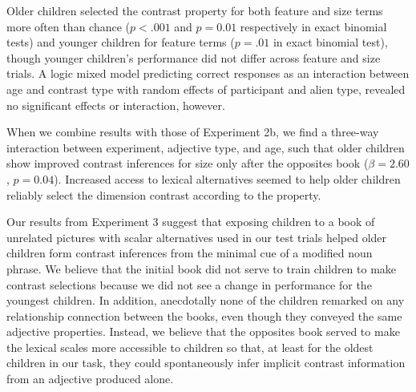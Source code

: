 \documentclass[10pt,letterpaper]{article}
\begin{document}
Older children selected the contrast property for both feature and size terms more often than chance ($p < .001$ and $p = 0.01$ respectively in exact binomial tests) and younger children for feature terms ($p = .01$ in exact binomial test), though younger children's performance did not differ across feature and size trials.  A logic mixed model predicting correct responses as an interaction between age and contrast type with random effects of participant and alien type, revealed no significant effects or interaction, however.

When we combine results with those of Experiment 2b, we find a three-way interaction between experiment, adjective type, and age, such that older children show improved contrast inferences for size only after the opposites book ($\beta = 2.60$, $p = 0.04$).  Increased access to lexical alternatives seemed to help older children reliably select the dimension contrast according to the property.  

Our results from Experiment 3 suggest that exposing children to a book of unrelated pictures with scalar alternatives used in our test trials helped older children form contrast inferences from the minimal cue of a modified noun phrase.  We believe that the initial book did not serve to train children to make contrast selections because we did not see a change in performance for the youngest children.  In addition, anecdotally none of the children remarked on any relationship connection between the books, even though they conveyed the same adjective properties.  Instead, we believe that the opposites book served to make the lexical scales more accessible to children so that, at least for the oldest children in our task, they could spontaneously infer implicit contrast information from an adjective produced alone.   

\end{document}
